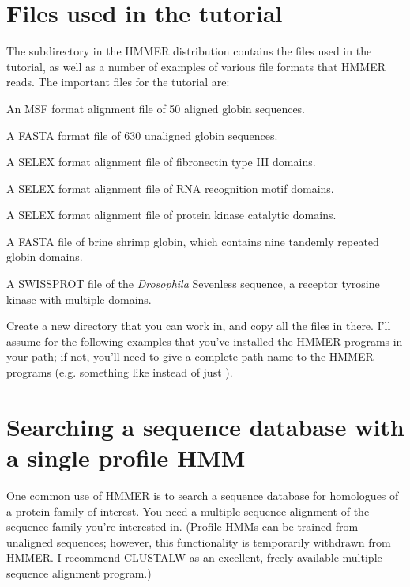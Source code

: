 \section{Files used in the tutorial}

The subdirectory  in the HMMER distribution contains the
files used in the tutorial, as well as a number of examples of various
file formats that HMMER reads. The important files for the tutorial
are:

\begin{wideitem}
\item[\emprog{globins50.msf}] An MSF format alignment file of 50 aligned globin sequences.
\item[\emprog{ globins630.fa}] A FASTA format file of 630 unaligned globin sequences.
\item[\emprog{ fn3.slx}] A SELEX format alignment file of fibronectin type III domains.
\item[\emprog{ rrm.slx}] A SELEX format alignment file of RNA recognition
motif domains.
\item[\emprog{ pkinase.slx}] A SELEX format alignment file of protein kinase
catalytic domains.
\item[\emprog{ Artemia.fa}] A FASTA file of brine shrimp globin, which contains
nine tandemly repeated globin domains.
\item[\emprog{ 7LES\_DROME}] A SWISSPROT file of the {\em Drosophila} 
Sevenless sequence, a receptor tyrosine kinase with multiple domains.
\end{wideitem}

Create a new directory that you can work in, and copy all the files in
 there. I'll assume for the following examples that you've
installed the HMMER programs in your path; if not, you'll need to give
a complete path name to the HMMER programs (e.g. something like  instead of just ).

\section{Searching a sequence database with a single profile HMM}

One common use of HMMER is to search a sequence database for
homologues of a protein family of interest. You need a multiple
sequence alignment of the sequence family you're interested in.
(Profile HMMs can be trained from unaligned sequences; however, this
functionality is temporarily withdrawn from HMMER. I recommend
CLUSTALW as an excellent, freely available multiple sequence alignment
program.)

